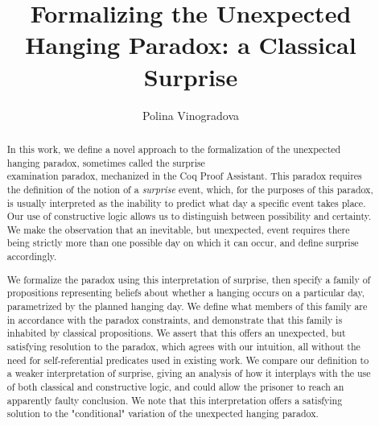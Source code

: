 \documentclass[runningheads]{llncs}
\begin{document}
%
\title{Formalizing the Unexpected Hanging Paradox: a Classical Surprise} %
%
%
\author{Polina Vinogradova }
%
%
%
\maketitle              %
%
\begin{abstract}

  In this work, we define a novel approach to the formalization of the
  unexpected hanging paradox, sometimes called the surprise \\
  examination paradox,
  mechanized in the Coq Proof Assistant.
  This paradox requires the definition of the notion of
  a \emph{surprise} event, which, for the purposes of this paradox, is usually interpreted as
  the inability to predict what day a specific event takes place. Our use of constructive logic allows us to distinguish between possibility and
  certainty.
  We make the observation that an inevitable, but unexpected, event requires there being strictly
  more than one possible day on which it can occur, and define surprise accordingly. \newline

  We
  formalize the paradox using this interpretation of surprise, then
  specify a family of
  propositions representing beliefs about whether a hanging occurs on a particular day,
  parametrized by the planned hanging day.
  We define what members of this family are in accordance with the paradox constraints, and
  demonstrate that this family is inhabited by classical propositions.
  We assert that this offers an unexpected, but satisfying resolution to the paradox, which
  agrees with
  our intuition, all without the need for self-referential predicates used in existing work.
  We compare our definition to a weaker interpretation of surprise,
  giving an analysis of how it interplays with the use of both classical and constructive logic,
  and could allow the prisoner to reach an apparently faulty conclusion. We note
  that this interpretation offers a satisfying solution to the "conditional"
  variation of the unexpected hanging paradox.

\end{abstract}
%
\end{document}
